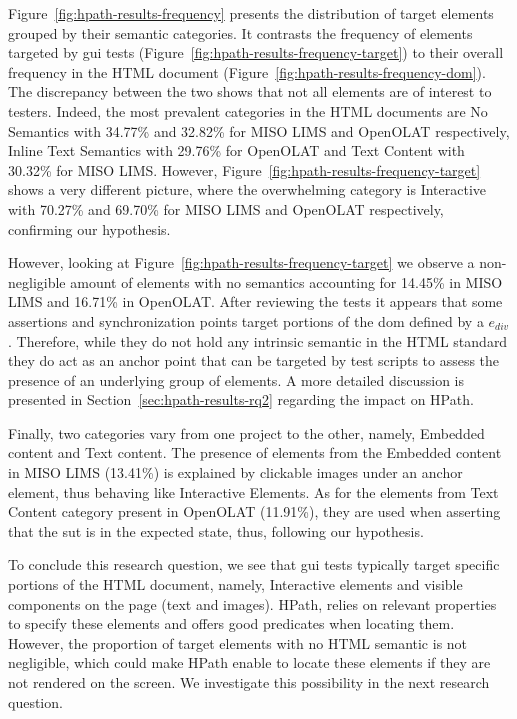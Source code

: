 Figure~\ref{fig:hpath-results-frequency} presents the distribution of target elements grouped by their semantic categories. It contrasts the frequency of elements targeted by \gls{gui} tests (Figure~\ref{fig:hpath-results-frequency-target}) to their overall frequency in the HTML document (Figure~\ref{fig:hpath-results-frequency-dom}). The discrepancy between the two shows that not all elements are of interest to testers. Indeed, the most prevalent categories in the HTML documents are No Semantics with 34.77\% and 32.82\% for MISO LIMS and OpenOLAT respectively, Inline Text Semantics with 29.76\% for OpenOLAT and Text Content with 30.32\% for MISO LIMS. However, Figure~\ref{fig:hpath-results-frequency-target} shows a very different picture, where the overwhelming category is Interactive with 70.27\% and 69.70\% for MISO LIMS and OpenOLAT respectively, confirming our hypothesis.

However, looking at Figure~\ref{fig:hpath-results-frequency-target} we observe a non-negligible amount of elements with no semantics accounting for 14.45\% in MISO LIMS and 16.71\% in OpenOLAT. After reviewing the tests it appears that some assertions and synchronization points target portions of the \gls{dom} defined by a $e_{div}$. Therefore, while they do not hold any intrinsic semantic in the HTML standard they do act as an anchor point that can be targeted by test scripts to assess the presence of an underlying group of elements. A more detailed discussion is presented in Section~\ref{sec:hpath-results-rq2} regarding the impact on HPath.

Finally, two categories vary from one project to the other, namely, Embedded content and Text content. The presence of elements from the Embedded content in MISO LIMS (13.41\%) is explained by clickable images under an anchor element, thus behaving like Interactive Elements. As for the elements from Text Content category present in OpenOLAT (11.91\%), they are used when asserting that the \gls{sut} is in the expected state, thus, following our hypothesis.

To conclude this research question, we see that \gls{gui} tests typically target specific portions of the HTML document, namely, Interactive elements and visible components on the page (text and images). HPath, relies on relevant properties to specify these elements and offers good predicates when locating them. However, the proportion of target elements with no HTML semantic is not negligible, which could make HPath enable to locate these elements if they are not rendered on the screen. We investigate this possibility in the next research question. 

